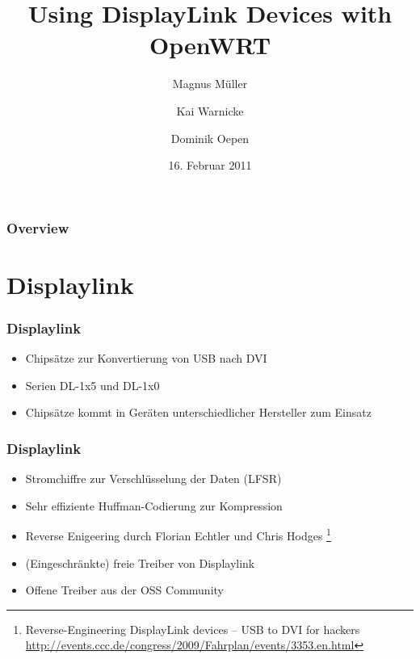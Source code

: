 \documentclass{beamer}
\title{Using DisplayLink Devices with OpenWRT}
\institute[{Humboldt-Universität zu Berlin}]{\inst{}Humboldt-Universität zu Berlin}
\author[Magnus Müller \and Kai Warnicke \and Dominik Oepen]{Magnus Müller \and Kai Warnicke \and Dominik Oepen}
\date[16.02.2011]{16. Februar 2011}
\begin{document}
	\begin{frame}
		\titlepage
	\end{frame}

	\begin{frame}
		\frametitle{Overview}
		\tableofcontents
	\end{frame}	

	\section{Displaylink}
	
	\begin{frame}
		\frametitle{Displaylink}
		\begin{itemize}
			\item Chipsätze zur Konvertierung von USB nach DVI
			\item Serien DL-1x5 und DL-1x0
			\item Chipsätze kommt in Geräten unterschiedlicher Hersteller zum Einsatz
		\end{itemize}	
	\end{frame}	
	
	\begin{frame}
		\frametitle{Displaylink}
		\begin{itemize}
			\item Stromchiffre zur Verschlüsselung der Daten (LFSR)
			\item Sehr effiziente Huffman-Codierung zur Kompression
			\item Reverse Enigeering durch Florian Echtler und Chris Hodges \footnote{Reverse-Engineering DisplayLink devices -- USB to DVI for hackers \url{http://events.ccc.de/congress/2009/Fahrplan/events/3353.en.html}}
			\item (Eingeschränkte) freie Treiber von Displaylink
			\item Offene Treiber aus der OSS Community
		\end{itemize}
	\end{frame}	
	
\end{document}
